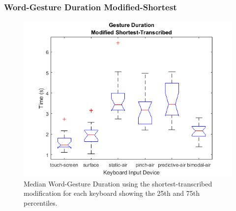 \subsubsection{Word-Gesture Duration Modified-Shortest}
\begin{figure}[h]
	\centering
	\includegraphics{fig_time_short_boxplot}
	\caption[Word-Gesture Duration Boxplot for Modified-Shortest]{Median Word-Gesture Duration using the shortest-transcribed modification for each keyboard showing the 25th and 75th percentiles.}
	\label{fig_time_short_boxplot}
\end{figure}

